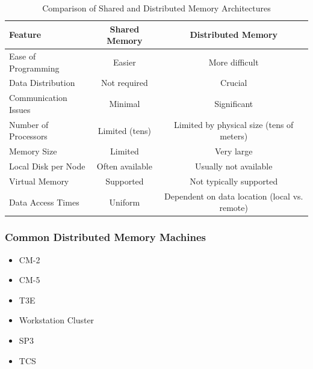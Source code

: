 \documentclass[12pt, a4paper]{book}
\begin{document}
\begin{table}[h!]
    \centering
    \caption{Comparison of Shared and Distributed Memory Architectures}
    \label{tab:shared_distributed}
    \begin{tabular}{|l|c|c|}
        \hline
        \textbf{Feature}     & \textbf{Shared Memory} & \textbf{Distributed Memory}                   \\ \hline
        Ease of Programming  & Easier                 & More difficult                                \\ \hline
        Data Distribution    & Not required           & Crucial                                       \\ \hline
        Communication Issues & Minimal                & Significant                                   \\ \hline
        Number of Processors & Limited (tens)         & Limited by physical size (tens of meters)     \\ \hline
        Memory Size          & Limited                & Very large                                    \\ \hline
        Local Disk per Node  & Often available        & Usually not available                         \\ \hline
        Virtual Memory       & Supported              & Not typically supported                       \\ \hline
        Data Access Times    & Uniform                & Dependent on data location (local vs. remote) \\ \hline
    \end{tabular}
\end{table}

\subsubsection{Common Distributed Memory Machines}
\begin{minipage}{0.5\linewidth}
    \begin{itemize}
        \item CM-2
        \item CM-5
        \item T3E
    \end{itemize}
\end{minipage}
\begin{minipage}{0.5\linewidth}
    \begin{itemize}
        \item Workstation Cluster
        \item  SP3
        \item  TCS
    \end{itemize}
\end{minipage}
\end{document}
